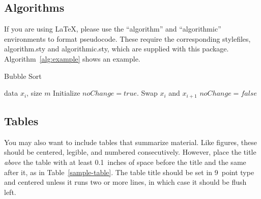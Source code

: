 \documentclass{article}
\begin{document}
\subsection{Algorithms}

If you are using \LaTeX, please use the ``algorithm'' and ``algorithmic''
environments to format pseudocode. These require
the corresponding stylefiles, algorithm.sty and
algorithmic.sty, which are supplied with this package.
Algorithm~\ref{alg:example} shows an example.

\begin{algorithm}[tb]
   \caption{Bubble Sort}
   \label{alg:example}
\begin{algorithmic}
    data $x_i$, size $m$
   \REPEAT
   \STATE Initialize $noChange = true$.
   \STATE Swap $x_i$ and $x_{i+1}$
   \STATE $noChange = false$
   \ENDIF
   \ENDFOR
\end{algorithmic}
\end{algorithm}

\subsection{Tables}

You may also want to include tables that summarize material. Like
figures, these should be centered, legible, and numbered consecutively.
However, place the title {\it above\/} the table with at least
0.1~inches of space before the title and the same after it, as in
Table~\ref{sample-table}. The table title should be set in 9~point
type and centered unless it runs two or more lines, in which case it
should be flush left.

\end{document}
